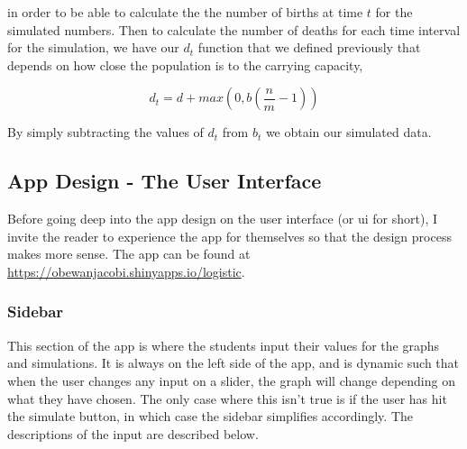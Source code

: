 \documentclass{article}\usepackage[]{graphicx}\usepackage[]{color}
\begin{document}
\noindent in order to be able to calculate the the number of births at time \(t\) for the simulated numbers. Then to calculate the number of deaths for each time interval for the simulation, we have our \(d_t\) function that we defined previously that depends on how close the population is to the carrying capacity, 

\begin{equation}
d_t = d + max(0, b(\frac{n}{m}-1))
\end{equation}

\noindent By simply subtracting the values of \(d_t\) from \(b_t\) we obtain our simulated data.






\subsection{App Design - The User Interface}

Before going deep into the app design on the user interface (or ui for short), I invite the reader to experience the app for themselves so that the design process makes more sense. The app can be found at \url{https://obewanjacobi.shinyapps.io/logistic}. 

\subsubsection{Sidebar}

This section of the app is where the students input their values for the graphs and simulations. It is always on the left side of the app, and is dynamic such that when the user changes any input on a slider, the graph will change depending on what they have chosen. The only case where this isn't true is if the user has hit the simulate button, in which case the sidebar simplifies accordingly. The descriptions of the input are described below.
\end{document}
